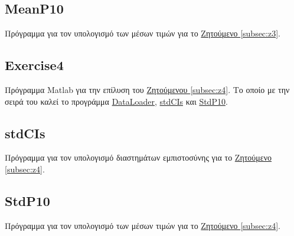 \documentclass[11pt]{scrartcl} %
\begin{document}
\subsection{MeanP10}
\label{prog:MeanP10}
Πρόγραμμα για τον υπολογισμό των μέσων τιμών για το \hyperref[subsection:z3]{Ζητούμενο \ref*{subsec:z3}}.

	
\subsection{Exercise4}
\label{prog:4}
Πρόγραμμα Matlab για την επίλυση του \hyperref[subsection:z4]{Ζητούμενου \ref*{subsec:z4}}. Το οποίο με την σειρά του καλεί το προγράμμα \hyperref[prog:DataLoader]{DataLoader}, \hyperref[prog:stdCIs]{stdCIs} και \hyperref[prog:StdP10]{StdP10}.


\subsection{stdCIs}
\label{prog:stdCIs}
Πρόγραμμα για τον υπολογισμό διαστημάτων εμπιστοσύνης για το \hyperref[subsection:z4]{Ζητούμενο \ref*{subsec:z4}}.


\subsection{StdP10}
\label{prog:StdP10}
Πρόγραμμα για τον υπολογισμό των μέσων τιμών για το \hyperref[subsection:z4]{Ζητούμενο \ref*{subsec:z4}}.

	
\end{document}
